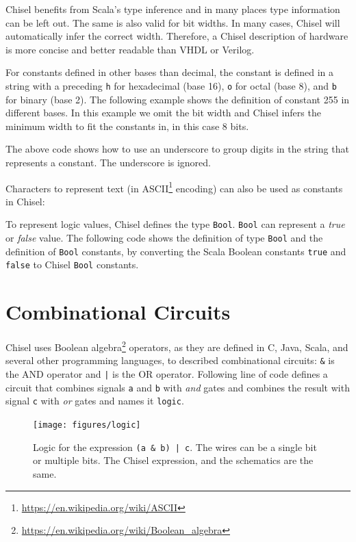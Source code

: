 \documentclass[%
    10pt,
    headinclude, footexclude,
    openright, %
    notitlepage,
    cleardoubleempty,
    headsepline,
    pointlessnumbers,
    bibtotoc, idxtotoc,
    ]{scrbook}
\newcommand{\code}[1]{{\small{\texttt{#1}}}}
\newcommand{\myref}[2]{\href{#1}{#2}}
\renewcommand{\myref}[2]{{#2}{\footnote{\url{#1}}}}
\begin{document}
Chisel benefits from Scala's type inference and in many places type information can be left out.
The same is also valid for bit widths. In many cases, Chisel will automatically infer the correct width.
Therefore, a Chisel description of hardware is more concise and better readable than VHDL or
Verilog.

For constants defined in other bases than decimal, the constant is defined in a string with
a preceding \code{h} for hexadecimal (base 16), \code{o} for octal (base 8), and \code{b}
for binary (base 2). The following example shows the definition of constant 255 in different
bases. In this example we omit the bit width and Chisel infers the minimum width to fit
the constants in, in this case 8 bits.


\noindent The above code shows how to use an underscore to group digits in the
string that represents a constant. The underscore is ignored.

Characters to represent text (in \myref{https://en.wikipedia.org/wiki/ASCII}{ASCII} encoding)
can also be used as constants in Chisel:



To represent logic values, Chisel defines the type \code{Bool}.
\code{Bool} can represent a \emph{true} or \emph{false} value.
The following code shows the definition of type \code{Bool} and the definition of
\code{Bool} constants, by converting the Scala Boolean constants \code{true}
and \code{false} to Chisel \code{Bool} constants.



\section{Combinational Circuits}

Chisel uses \myref{https://en.wikipedia.org/wiki/Boolean_algebra}{Boolean algebra} operators,
as they are defined in C, Java, Scala, and several other programming languages,
to described combinational circuits: \code{\&} is the AND operator and \code{|} is
the OR operator.
Following line of code defines a circuit that combines signals \code{a} and \code{b} with \emph{and}
gates and combines the result with signal \code{c} with \emph{or} gates and names it \code{logic}.


\begin{figure}
  \centering
  \texttt{[image: figures/logic]}
  \caption{Logic for the expression \code{(a \& b) | c}.
  The wires can be a single bit or multiple bits. The Chisel expression, and the schematics are the same.}
  \label{fig:logic}
\end{figure}
\end{document}
